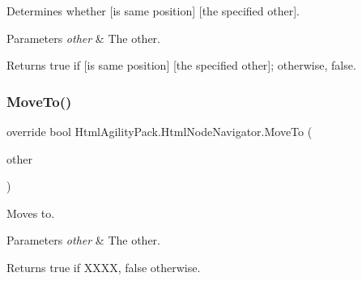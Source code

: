 Determines whether \mbox{[}is same position\mbox{]} \mbox{[}the specified other\mbox{]}. 


\begin{DoxyParams}{Parameters}
{\em other} & The other.\\
\hline
\end{DoxyParams}
\begin{DoxyReturn}{Returns}
{\ttfamily true} if \mbox{[}is same position\mbox{]} \mbox{[}the specified other\mbox{]}; otherwise, {\ttfamily false}.
\end{DoxyReturn}
\mbox{\label{class_html_agility_pack_1_1_html_node_navigator_ac390a43d465998e92f487003df471541}} 
\subsubsection{\texorpdfstring{Move\+To()}{MoveTo()}}
{\footnotesize\ttfamily override bool Html\+Agility\+Pack.\+Html\+Node\+Navigator.\+Move\+To (\begin{DoxyParamCaption}\item[{X\+Path\+Navigator}]{other }\end{DoxyParamCaption})\hspace{0.3cm}{\ttfamily [inline]}}



Moves to. 


\begin{DoxyParams}{Parameters}
{\em other} & The other.\\
\hline
\end{DoxyParams}
\begin{DoxyReturn}{Returns}
{\ttfamily true} if X\+X\+XX, {\ttfamily false} otherwise.
\end{DoxyReturn}
\mbox{\label{class_html_agility_pack_1_1_html_node_navigator_a6b7fc67311c2ac265885e54c5635541f}} 
